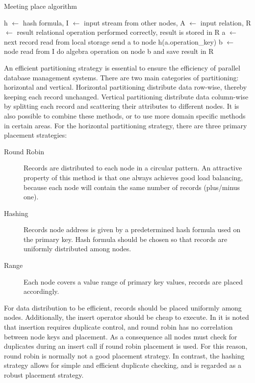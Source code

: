 \begin{algorithm}
	\caption{Meeting place algorithm}
	\label{alg:meeting-place}
	\begin{algorithmic}
		\REQUIRE h $\leftarrow$ hash formula, I $\leftarrow$ input
		stream from other nodes, A $\leftarrow$ input relation, R
		$\leftarrow$ result
		\ENSURE relational operation performed correctly, result is
		stored in R
				\STATE a $\leftarrow$ next record read from local storage
				\STATE send a to node h(a.operation\_key)
			\ENDIF
				\STATE b $\leftarrow$ node read from I
				\STATE do algebra operation on node b and save result in R
			\ENDIF
		\ENDWHILE
	\end{algorithmic}
\end{algorithm}

An efficient partitioning strategy is essential to ensure the
efficiency of parallel database management systems. There are two main
categories of partitioning: horizontal and vertical. Horizontal
partitioning distribute data row-wise, thereby keeping each record
unchanged. Vertical partitioning distribute data column-wise by
splitting each record and scattering their attributes to different
nodes. It is also possible to combine these methods, or to use more
domain specific methods in certain areas. For the horizontal
partitioning strategy, there are three primary placement strategies:

\begin{description}
	\item[Round Robin] Records are distributed to each node in a
	circular pattern. An attractive property of this method is that
	one always achieves good load balancing, because each node will
	contain the same number of records (plus/minus one).
	\item[Hashing] Records node address is given by a predetermined
	hash formula used on the primary key. Hash formula should be
	chosen so that records are uniformly distributed among nodes.
	\item[Range] Each node covers a value range of primary key values,
	records are placed accordingly.
\end{description}

For data distribution to be efficient, records should be placed
uniformly among nodes. Additionally, the insert operator should be
cheap to execute. In \cite{bratbergsengen} it is noted that insertion
requires duplicate control, and round robin has no correlation between
node keys and placement. As a consequence all nodes must check for
duplicates during an insert call if round robin placement is used.
For this reason, round robin is normally not a good placement
strategy. In contrast, the hashing strategy allows for simple and
efficient duplicate checking, and is regarded as a robust placement
strategy.
